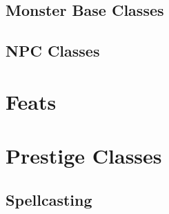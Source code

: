 \documentclass[10pt]{report}
\begin{document}
\section{Monster Base Classes}





\section{NPC Classes}





\chapter{Feats}






\chapter{Prestige Classes}

\section{Spellcasting}




%

























\end{document}
